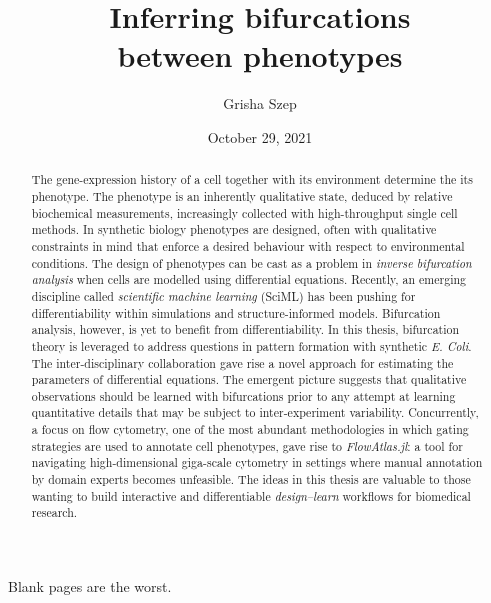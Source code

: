 \title{Inferring bifurcations\\between phenotypes}
\author{Grisha Szep}


\date{October 29, 2021}
\maketitle

\begin{abstract} %
    
    The gene-expression history of a cell together with its environment determine the its phenotype. The phenotype is an inherently qualitative state, deduced by relative biochemical measurements, increasingly collected with high-throughput single cell methods. In synthetic biology phenotypes are designed, often with qualitative constraints in mind that enforce a desired behaviour with respect to environmental conditions. The design of phenotypes can be cast as a problem in \emph{inverse bifurcation analysis} when cells are modelled using differential equations. Recently, an emerging discipline called \emph{scientific machine learning} (SciML) has been pushing for differentiability within simulations and structure-informed models. Bifurcation analysis, however, is yet to benefit from differentiability. In this thesis, bifurcation theory is leveraged to address questions in pattern formation with synthetic \emph{E. Coli}. The inter-disciplinary collaboration gave rise a novel approach for estimating the parameters of differential equations. The emergent picture suggests that qualitative observations should be learned with bifurcations prior to any attempt at learning quantitative details that may be subject to inter-experiment variability. Concurrently, a focus on flow cytometry, one of the most abundant methodologies in which gating strategies are used to annotate cell phenotypes, gave rise to \emph{FlowAtlas.jl}: a tool for navigating high-dimensional giga-scale cytometry in settings where manual annotation by domain experts becomes unfeasible. The ideas in this thesis are valuable to those wanting to build interactive and differentiable \emph{design--learn} workflows for biomedical research.

\end{abstract}
\newpage
\clearpage
\thispagestyle{empty}
\noindent Blank pages are the worst.\\
